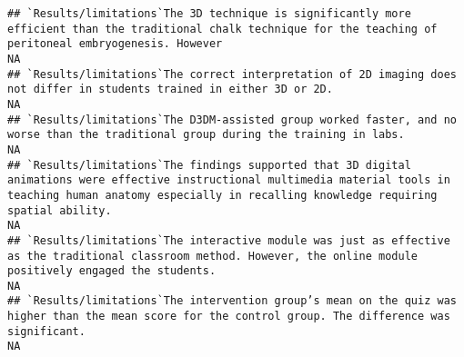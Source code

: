 \documentclass[]{article}
\begin{document}
\begin{verbatim}
## `Results/limitations`The 3D technique is significantly more efficient than the traditional chalk technique for the teaching of peritoneal embryogenesis. However                                                                                                                                                                                                                                                                                                                      NA
## `Results/limitations`The correct interpretation of 2D imaging does not differ in students trained in either 3D or 2D.                                                                                                                                                                                                                                                                                                                                                                 NA
## `Results/limitations`The D3DM-assisted group worked faster, and no worse than the traditional group during the training in labs.                                                                                                                                                                                                                                                                                                                                                      NA
## `Results/limitations`The findings supported that 3D digital animations were effective instructional multimedia material tools in teaching human anatomy especially in recalling knowledge requiring spatial ability.                                                                                                                                                                                                                                                                  NA
## `Results/limitations`The interactive module was just as effective as the traditional classroom method. However, the online module positively engaged the students.                                                                                                                                                                                                                                                                                                                    NA
## `Results/limitations`The intervention group’s mean on the quiz was higher than the mean score for the control group. The difference was significant.                                                                                                                                                                                                                                                                                                                                  NA

\end{verbatim}
\end{document}
